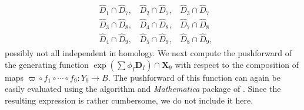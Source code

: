 \documentclass[11pt,oneside,english]{article}
\numberwithin{equation}{section}
\theoremstyle{definition}
\begin{document}
	\begin{align}
		\begin{split}
			&\hat D_{1} \cap \hat D_7,~~~~\hat D_{2}\cap \hat D_7,~~~~\hat D_{3}\cap \hat D_7\\
			&\hat D_{3}\cap \hat D_8,~~~~ \hat D_{4}\cap \hat D_8 ,~~~~\hat D_{7} \cap\hat D_8\\
			&\hat D_{4}\cap \hat D_9,~~~~\hat D_{5}\cap \hat D_9 , ~~~~\hat D_8\cap \hat D_9,
		\end{split}
	\end{align}
possibly not all independent in homology. We next compute the pushforward of the generating function $\exp(\sum \phi_I \boldsymbol{D}_I) \cap \boldsymbol X_9$ with respect to the composition of maps $\varpi \circ f_1 \circ \cdots \circ f_9 : Y_9 \rightarrow B$. The  pushforward of this function can again be easily evaluated using the algorithm and \emph{Mathematica} package of \cite{Jefferson:2022xft}. Since the resulting expression is rather cumbersome, we do not include it here. 
\end{document}
